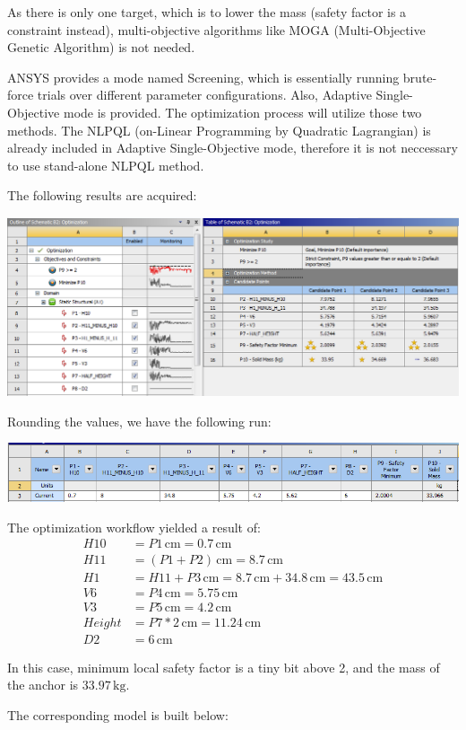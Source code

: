 \documentclass[a4paper,14pt]{extarticle}
\newcommand{\cm}{\,\si{\centi\meter}}
\newcommand{\kg}{\,\si{\kilo\gram}}
\begin{document}
As there is only one target, which is to lower the mass (safety factor is a constraint instead), multi-objective algorithms like MOGA (Multi-Objective Genetic Algorithm) is not needed.

ANSYS provides a mode named Screening, which is essentially running brute-force trials over different parameter configurations. Also, Adaptive Single-Objective mode is provided. The optimization process will utilize those two methods. The NLPQL (on-Linear Programming by Quadratic Lagrangian) is already included in Adaptive Single-Objective mode, therefore it is not neccessary to use stand-alone NLPQL method.

The following results are acquired:

\includegraphics[width=\textwidth]{ASO_RESULT_1.PNG}

Rounding the values, we have the following run:

\includegraphics[width=\textwidth]{EX_OPTM_FINAL.PNG}

The optimization workflow yielded a result of:
\begin{align*}
H10 &= P1 \cm = 0.7 \cm\\
H11 &= (P1 + P2) \cm = 8.7 \cm\\
H1 &= H11 + P3 \cm = 8.7 \cm + 34.8 \cm = 43.5 \cm\\
V6 &= P4 \cm = 5.75 \cm\\
V3 &= P5 \cm = 4.2 \cm\\
Height &= P7 * 2 \cm = 11.24 \cm\\
D2 &= 6 \cm 
\end{align*}

In this case, minimum local safety factor is a tiny bit above 2, and the mass of the anchor is $33.97\kg$. 

The corresponding model is built below:
\end{document}
